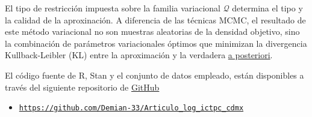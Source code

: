\documentclass[11pt]{article}
\begin{document}
El tipo de restricción impuesta sobre la familia variacional $\mathcal{Q}$ determina el tipo y la calidad de la aproxinación. A diferencia de las técnicas MCMC, el resultado de este método variacional no son muestras aleatorias de la densidad objetivo, sino la combinación de parámetros variacionales óptimos que minimizan la divergencia Kullback-Leibler (KL) entre la aproximación y la verdadera \underline{a posteriori}.

El código fuente de R, Stan y el conjunto de datos empleado, están disponibles a través del siguiente repositorio de \underline{GitHub}
\begin{itemize}
\item \texttt{\url{https://github.com/Demian-33/Articulo_log_ictpc_cdmx}}
\end{itemize}
\end{document}
